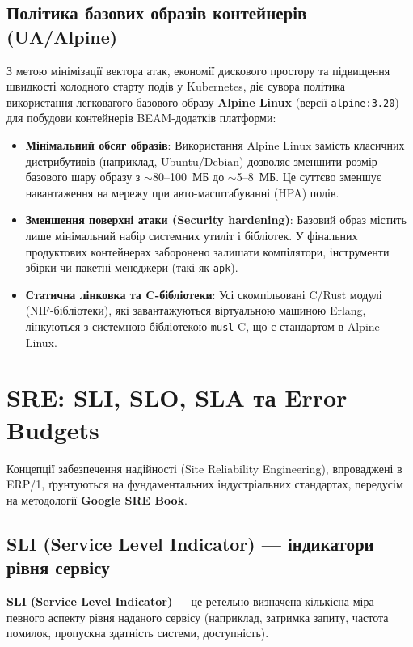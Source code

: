 \documentclass[12pt,a4paper]{article}
\begin{document}
\subsection{Політика базових образів контейнерів (UA/Alpine)}

З метою мінімізації вектора атак, економії дискового простору та підвищення швидкості холодного старту подів у Kubernetes,
діє сувора політика використання легковагого базового образу \textbf{Alpine Linux} (версії \texttt{alpine:3.20}) для побудови контейнерів BEAM-додатків платформи:

\begin{itemize}
    \item \textbf{Мінімальний обсяг образів}: Використання Alpine Linux замість класичних дистрибутивів (наприклад, Ubuntu/Debian) дозволяє зменшити розмір базового шару образу з $\sim$80--100~МБ до $\sim$5--8~МБ. Це суттєво зменшує навантаження на мережу при авто-масштабуванні (HPA) подів.
    \item \textbf{Зменшення поверхні атаки (Security hardening)}: Базовий образ містить лише мінімальний набір системних утиліт і бібліотек. У фінальних продуктових контейнерах заборонено залишати компілятори, інструменти збірки чи пакетні менеджери (такі як \texttt{apk}).
    \item \textbf{Статична лінковка та C-бібліотеки}: Усі скомпільовані C/Rust модулі (NIF-бібліотеки), які завантажуються віртуальною машиною Erlang, лінкуються з системною бібліотекою \texttt{musl} C, що є стандартом в Alpine Linux.
\end{itemize}

\newpage
\section{SRE: SLI, SLO, SLA та Error Budgets}

Концепції забезпечення надійності (Site Reliability Engineering), впроваджені в ERP/1, ґрунтуються на фундаментальних індустріальних стандартах,
передусім на методології \textbf{Google SRE Book}.

\subsection{SLI (Service Level Indicator) --- індикатори рівня сервісу}

\textbf{SLI (Service Level Indicator)} --- це ретельно визначена кількісна міра певного аспекту рівня наданого сервісу (наприклад,
затримка запиту, частота помилок, пропускна здатність системи, доступність).
\end{document}
